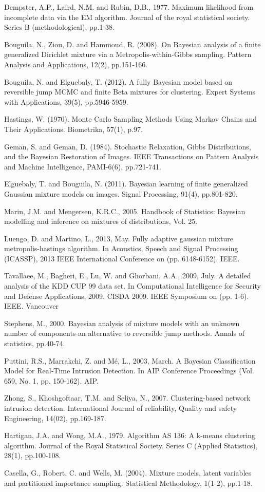 \documentclass[conference]{IEEEtran}
\begin{document}
\begin{thebibliography}{[MT1]}
 Dempster, A.P., Laird, N.M. and Rubin, D.B., 1977. Maximum likelihood from incomplete data via the EM algorithm. Journal of the royal statistical society. Series B (methodological), pp.1-38.

 Bouguila, N., Ziou, D. and Hammoud, R. (2008). On Bayesian analysis of a finite generalized Dirichlet mixture via a Metropolis-within-Gibbs sampling. Pattern Analysis and Applications, 12(2), pp.151-166.

 Bouguila, N. and Elguebaly, T. (2012). A fully Bayesian model based on reversible jump MCMC and finite Beta mixtures for clustering. Expert Systems with Applications, 39(5), pp.5946-5959.

 Hastings, W. (1970). Monte Carlo Sampling Methods Using Markov Chains and Their Applications. Biometrika, 57(1), p.97.

 Geman, S. and Geman, D. (1984). Stochastic Relaxation, Gibbs Distributions, and the Bayesian Restoration of Images. IEEE Transactions on Pattern Analysis and Machine Intelligence, PAMI-6(6), pp.721-741.



 Elguebaly, T. and Bouguila, N. (2011). Bayesian learning of finite generalized Gaussian mixture models on images. Signal Processing, 91(4), pp.801-820.

 Marin, J.M. and Mengersen, K.R.C., 2005. Handbook of Statistics: Bayesian modelling and inference on mixtures of distributions, Vol. 25.

 Luengo, D. and Martino, L., 2013, May. Fully adaptive gaussian mixture metropolis-hastings algorithm. In Acoustics, Speech and Signal Processing (ICASSP), 2013 IEEE International Conference on (pp. 6148-6152). IEEE.

 Tavallaee, M., Bagheri, E., Lu, W. and Ghorbani, A.A., 2009, July. A detailed analysis of the KDD CUP 99 data set. In Computational Intelligence for Security and Defense Applications, 2009. CISDA 2009. IEEE Symposium on (pp. 1-6). IEEE.
Vancouver	

 Stephens, M., 2000. Bayesian analysis of mixture models with an unknown number of components-an alternative to reversible jump methods. Annals of statistics, pp.40-74.

 Puttini, R.S., Marrakchi, Z. and Mé, L., 2003, March. A Bayesian Classification Model for Real‐Time Intrusion Detection. In AIP Conference Proceedings (Vol. 659, No. 1, pp. 150-162). AIP.

 Zhong, S., Khoshgoftaar, T.M. and Seliya, N., 2007. Clustering-based network intrusion detection. International Journal of reliability, Quality and safety Engineering, 14(02), pp.169-187.

 Hartigan, J.A. and Wong, M.A., 1979. Algorithm AS 136: A k-means clustering algorithm. Journal of the Royal Statistical Society. Series C (Applied Statistics), 28(1), pp.100-108.

 Casella, G., Robert, C. and Wells, M. (2004). Mixture models, latent variables and partitioned importance sampling. Statistical Methodology, 1(1-2), pp.1-18.
\end{thebibliography}
\end{document}
